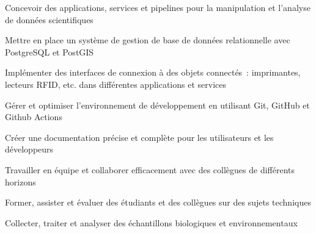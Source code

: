

\begin{cvskills}

  \begin{minipage}[t]{0.45\textwidth}
    \cvskill
      {Concevoir des applications, services et pipelines pour la manipulation et l’analyse de données scientifiques}
  \end{minipage}\hfill
  \begin{minipage}[t]{0.45\textwidth}
    \cvskill
      {Mettre en place un système de gestion de base de données relationnelle avec PostgreSQL et PostGIS}
  \end{minipage}

  \begin{minipage}[t]{0.45\textwidth}
    \cvskill
      {Implémenter des interfaces de connexion à des objets connectés : imprimantes, lecteurs RFID, etc. dans différentes applications et services}
  \end{minipage}\hfill
  \begin{minipage}[t]{0.45\textwidth}
    \cvskill
      {Gérer et optimiser l’environnement de développement en utilisant Git, GitHub et Github Actions}
  \end{minipage}

  \begin{minipage}[t]{0.45\textwidth}
    \cvskill
      {Créer une documentation précise et complète pour les utilisateurs et les développeurs}
  \end{minipage}\hfill
  \begin{minipage}[t]{0.45\textwidth}
    \cvskill
      {Travailler en équipe et collaborer efficacement avec des collègues de différents horizons}
  \end{minipage}

  \begin{minipage}[t]{0.45\textwidth}
    \cvskill
      {Former, assister et évaluer des étudiants et des collègues sur des sujets techniques}
  \end{minipage}\hfill
  \begin{minipage}[t]{0.45\textwidth}
    \cvskill
      {Collecter, traiter et analyser des échantillons biologiques et environnementaux}
  \end{minipage}

\end{cvskills}